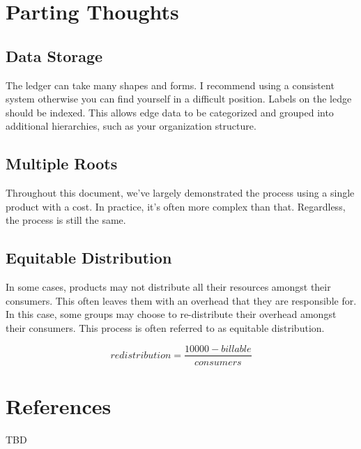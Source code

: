 \documentclass[10pt, a4paper, twocolumn]{article}
\begin{document}
\section*{Parting Thoughts}

  \subsection*{Data Storage}
    The ledger can take many shapes and forms.
    I recommend using a consistent system otherwise you can find yourself in a difficult position.
    Labels on the ledge should be indexed.
    This allows edge data to be categorized and grouped into additional hierarchies, such as your organization structure.

  \subsection*{Multiple Roots}
    Throughout this document, we've largely demonstrated the process using a single product with a cost.
    In practice, it's often more complex than that.
    Regardless, the process is still the same.

  \subsection*{Equitable Distribution}
    In some cases, products may not distribute all their resources amongst their consumers.
    This often leaves them with an overhead that they are responsible for.
    In this case, some groups may choose to re-distribute their overhead amongst their consumers.
    This process is often referred to as equitable distribution.

    \[ redistribution = \frac{10000 - billable}{consumers} \]

\section*{References}
  TBD
\end{document}
